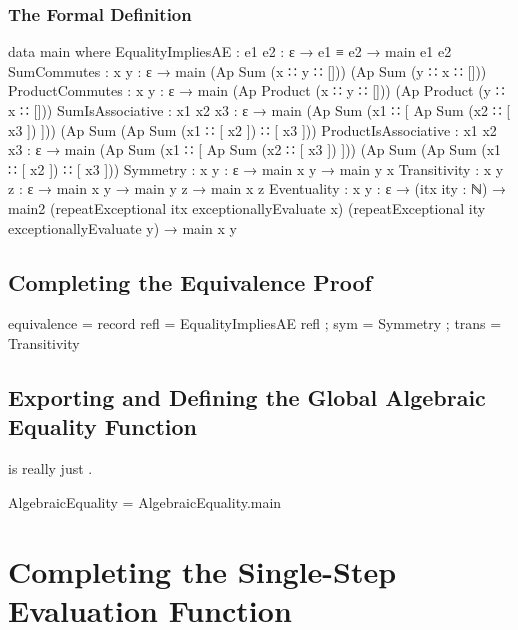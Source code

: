 \documentclass{report}
\begin{document}
\subsubsection{The Formal Definition}

\begin{code}
    data main where
      EqualityImpliesAE : {e1 e2 : ε} → e1 ≡ e2 → main e1 e2
      SumCommutes :
        {x y : ε} → main (Ap Sum (x ∷ y ∷ [])) (Ap Sum (y ∷ x ∷ []))
      ProductCommutes :
        {x y : ε} → main (Ap Product (x ∷ y ∷ [])) (Ap Product (y ∷ x ∷ []))
      SumIsAssociative :
        {x1 x2 x3 : ε} →
        main (Ap Sum (x1 ∷ [ Ap Sum (x2 ∷ [ x3 ]) ]))
             (Ap Sum (Ap Sum (x1 ∷ [ x2 ]) ∷ [ x3 ]))
      ProductIsAssociative :
        {x1 x2 x3 : ε} →
        main (Ap Sum (x1 ∷ [ Ap Sum (x2 ∷ [ x3 ]) ]))
             (Ap Sum (Ap Sum (x1 ∷ [ x2 ]) ∷ [ x3 ]))
      Symmetry : {x y : ε} → main x y → main y x
      Transitivity : {x y z : ε} → main x y → main y z → main x z
      Eventuality :
        {x y : ε} →
        (itx ity : ℕ) →
        main2 (repeatExceptional itx exceptionallyEvaluate x)
              (repeatExceptional ity exceptionallyEvaluate y) →
        main x y
\end{code}

\subsection{Completing the Equivalence Proof}

\begin{code}
    equivalence = record
      { refl = EqualityImpliesAE refl
      ; sym = Symmetry
      ; trans = Transitivity
      }
\end{code}

\begin{code}
\end{code}

\subsection{Exporting and Defining the Global Algebraic Equality Function}
 is really just .

\begin{code}
  AlgebraicEquality = AlgebraicEquality.main
\end{code}

\section{Completing the Single-Step Evaluation Function}
\end{document}
